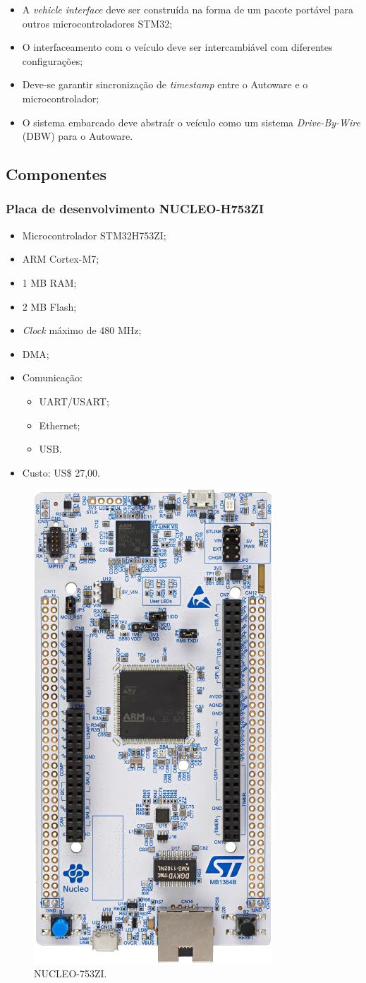 	\begin{itemize}
		\item A \textit{vehicle interface} deve ser construída na forma de um pacote portável para outros microcontroladores STM32;
		\item O interfaceamento com o veículo deve ser intercambiável com diferentes configurações;
		\item Deve-se garantir sincronização de \textit{timestamp} entre o Autoware e o microcontrolador;
		\item O sistema embarcado deve abstraír o veículo como um sistema \textit{Drive-By-Wire} (DBW) para o Autoware.
	\end{itemize}
	
\subsection{Componentes}

\subsubsection*{Placa de desenvolvimento NUCLEO-H753ZI}
	
	\begin{itemize}
		\item Microcontrolador STM32H753ZI;
		\item ARM Cortex-M7;
		\item 1 MB RAM;
		\item 2 MB Flash;
		\item \textit{Clock} máximo de 480 MHz;
		\item DMA;
		\item Comunicação:
		\begin{itemize}
			\item UART/USART;
			\item Ethernet;
			\item USB.
		\end{itemize}
		\item Custo: US\$ 27,00.
	\end{itemize}

\begin{figure}[!h]
	\centering
	\includegraphics[width=0.25\linewidth]{img/nucleo}
	\caption{NUCLEO-753ZI.}
	\label{fig:nucleo}
\end{figure}

